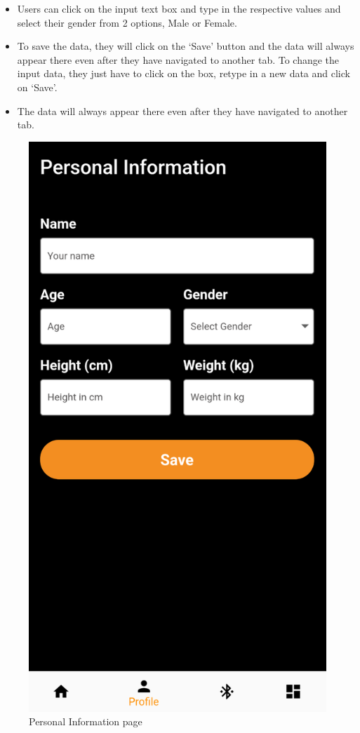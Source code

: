 \documentclass[a4paper]{scrreprt}
\begin{document}
\begin{itemize}
    \item Users can click on the input text box and type in the respective values and select their gender from 2 options, Male or Female.
    \item To save the data, they will click on the ‘Save’ button and the data will always appear there even after they have navigated to another tab. To change the input data, they just have to click on the box, retype in a new data and click on ‘Save’.
    \item The data will always appear there even after they have navigated to another tab.
\end{itemize}

\begin{figure}[h]
    \centering
    \includegraphics[scale=0.43]{personal_info.png}
    \caption{Personal Information page}
    \label{fig:personal-info}
\end{figure}
\clearpage
\end{document}
